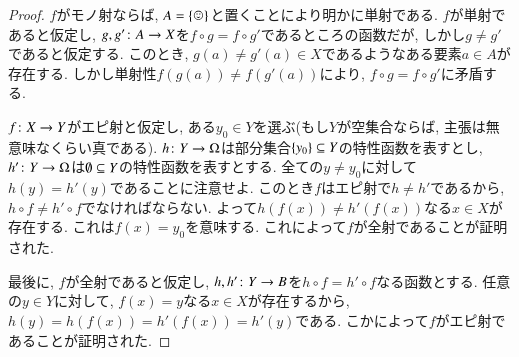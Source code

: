 \begin{proof}


$f$がモノ射ならば, $A=\singleton$と置くことにより明かに単射である. $f$が単射であると仮定し, $g,g'\taking A\to X$を$f\circ g=f\circ g'$であるところの函数だが, しかし$g\neq g'$であると仮定する. このとき, $g(a)\neq g'(a)\in X$であるようなある要素$a\in A$が存在する. しかし単射性$f(g(a))\neq f(g'(a))$により, $f\circ g=f\circ g'$に矛盾する.


$f\taking X\to Y$がエピ射と仮定し, ある$y_0\in Y$を選ぶ(もし$Y$が空集合ならば, 主張は無意味なくらい真である). $h\taking Y\to\Omega$は部分集合$\{y_0\}\ss Y$の特性函数を表すとし, $h'\taking Y\to\Omega$は$\emptyset\ss Y$の特性函数を表すとする. 全ての$y\neq y_0$に対して$h(y)=h'(y)$であることに注意せよ. このとき$f$はエピ射で$h\neq h'$であるから, $h\circ f\neq h'\circ f$でなければならない. よって$h(f(x))\neq h'(f(x))$なる$x\in X$が存在する. これは$f(x)=y_0$を意味する. これによって$f$が全射であることが証明された.


最後に, $f$が全射であると仮定し, $h,h'\taking Y\to B$を$h\circ f=h'\circ f$なる函数とする. 任意の$y\in Y$に対して, $f(x)=y$なる$x\in X$が存在するから, $h(y)=h(f(x))=h'(f(x))=h'(y)$である. こかによって$f$がエピ射であることが証明された.

\end{proof}

